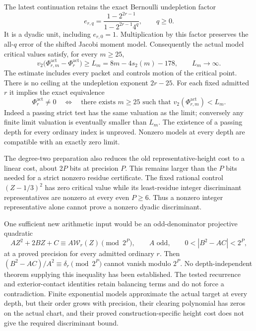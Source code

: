 The latest continuation retains the exact Bernoulli undepletion factor
\[
 e_{r,q}=\frac{1-2^{2r-1}}{1-2^{2r-1}4^q},\qquad q\ge0.
\]
It is a dyadic unit, including $e_{r,0}=1$. Multiplication by this
factor preserves the all-$q$ error of the shifted Jacobi moment model.
Consequently the actual model critical values satisfy, for every $m\ge25$,
\begin{equation}
 v_2\bigl(\Phi_{r,m}^{\mathrm{act}}-\Phi_r^{\mathrm{act}}\bigr)
 \ge L_m=8m-4s_2(m)-178,
 \qquad L_m\longrightarrow\infty.
 \label{eq:root:actualapprox}
\end{equation}
The estimate includes every packet and controls motion of the critical
point. There is no ceiling at the undepletion exponent $2r-25$.
For each fixed admitted $r$ it implies the exact equivalence
\begin{equation}
 \Phi_r^{\mathrm{act}}\ne0
 \quad\Longleftrightarrow\quad
 \text{there exists }m\ge25\text{ such that }
 v_2(\Phi_{r,m}^{\mathrm{act}})<L_m.
 \label{eq:root:stricttest}
\end{equation}
Indeed a passing strict test has the same valuation as the limit; conversely
any finite limit valuation is eventually smaller than $L_m$.
The existence of a passing depth for every ordinary index is unproved.
Nonzero models at every depth are compatible with an exactly zero limit.

The degree-two preparation also reduces the old representative-height
cost to a linear cost, about $2P$ bits at precision $P$. This remains
larger than the $P$ bits needed for a strict nonzero residue certificate.
The fixed rational control $(Z-1/3)^2$ has zero critical value while
its least-residue integer discriminant representatives are nonzero at
every even $P\ge6$. Thus a nonzero integer representative alone cannot
prove a nonzero dyadic discriminant.

One sufficient new arithmetic input would be an odd-denominator
projective quadratic
\[
 A Z^2+2BZ+C\equiv A\mathcal W_r(Z)\pmod{2^P},\qquad A\text{ odd},
 \qquad 0<|B^2-AC|<2^P,
\]
at a proved precision for every admitted ordinary $r$.
Then $(B^2-AC)/A^2\equiv\delta_r\pmod{2^P}$ cannot vanish
modulo $2^P$. No depth-independent theorem supplying this inequality
has been established. The tested recurrence and exterior-contact
identities retain balancing terms and do not force a contradiction.
Finite exponential models approximate the actual target at every depth,
but their order grows with precision, their clearing polynomial has
zeros on the actual chart, and their proved construction-specific height
cost does not give the required discriminant bound.

